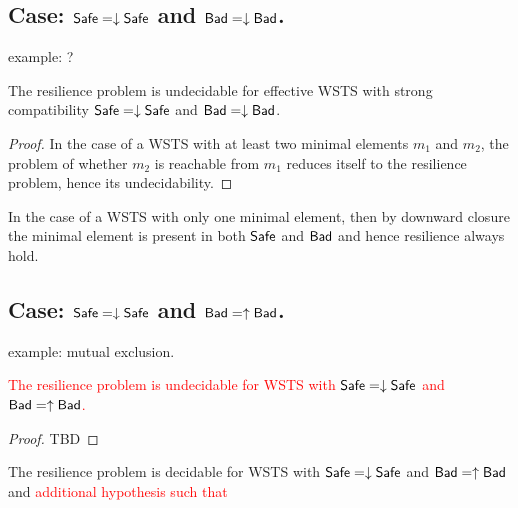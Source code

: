 

\subsection{Case: $\textsf{Safe}=\downarrow \textsf{Safe}$ and $\textsf{Bad}=\downarrow \textsf{Bad}$.}

example: ?


\begin{theorem}\label{down-down}
The resilience problem is undecidable for effective WSTS with strong compatibility
$\textsf{Safe}=\downarrow \textsf{Safe}$
and $\textsf{Bad}=\downarrow \textsf{Bad}$.
\end{theorem}

\begin{proof}
In the case of a WSTS with at least two minimal elements $m_1$ and $m_2$, the problem of whether $m_2$ is reachable from $m_1$ reduces itself to the resilience problem, hence its undecidability.  
\end{proof}

In the case of a WSTS with only one minimal element,  
then by downward closure the minimal element is present in both $\textsf{Safe}$ and $\textsf{Bad}$ and hence resilience always hold.






\subsection{Case: $\textsf{Safe}=\downarrow \textsf{Safe}$ and $\textsf{Bad}=\uparrow \textsf{Bad}$.}
%
%
example: mutual exclusion.

\begin{theorem}\label{up-down}
\textcolor{red}{
The resilience problem is undecidable for WSTS with 
$\textsf{Safe}=\downarrow \textsf{Safe}$
and $\textsf{Bad}=\uparrow \textsf{Bad}$.
}
\end{theorem}

\begin{proof}
TBD
\end{proof}



\begin{theorem}
The resilience problem is decidable for WSTS with 
$\textsf{Safe}=\downarrow \textsf{Safe}$
and $\textsf{Bad}=\uparrow \textsf{Bad}$
and
\textcolor{red}{
additional hypothesis such that 
}
\end{theorem}

